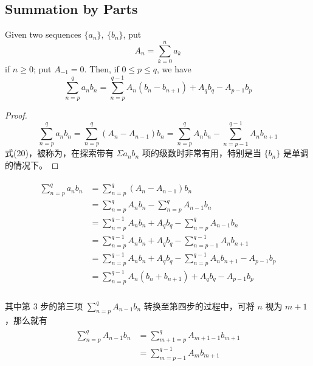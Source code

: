 \documentclass[../poma-notes.tex]{subfiles}
\begin{document}
\subsection*{Summation by Parts}

\begin{theorem}
  Given two sequences $\{a_n\},\ \{b_n\}$, put
  \[ A_n = \sum_{k=0}^{n} a_k \]
  if $n \ge 0$; put $A_{-1} = 0$. Then, if $0 \le p \le q$, we have
  \begin{equation}
    \sum_{n=p}^{q} a_n b_n = \sum_{n=p}^{q-1} A_n(b_n-b_{n+1}) + A_q b_q - A_{p-1}b_p
  \end{equation}
\end{theorem}

\begin{proof}
  \[
    \sum_{n=p}^{q} a_n b_n = \sum_{n=p}^{q}(A_n - A_{n-1})b_n = \sum_{n=p}^{q} A_n b_n - \sum_{n=p-1}^{q-1}A_n b_{n+1}
  \]
  式(20)，被称为，在探索带有 $\Sigma a_n b_n$ 项的级数时非常有用，特别是当 $\{b_n\}$
  是单调的情况下。
\end{proof}

\begin{anote}
  \begin{align*}
    \begin{split}
      \sum_{n=p}^{q} a_n b_n & = \sum_{n=p}^{q} (A_n - A_{n-1}) b_n \\
      & = \sum_{n=p}^{q} A_n b_n - \sum_{n=p}^{q} A_{n-1} b_n \\
      & = \sum_{n=p}^{q-1} A_n b_n + A_q b_q - \sum_{n=p}^{q} A_{n-1} b_n \\
      & = \sum_{n=p}^{q-1} A_n b_n + A_q b_q - \sum_{n=p-1}^{q-1} A_n b_{n+1} \\
      & = \sum_{n=p}^{q-1} A_n b_n + A_q b_q - \sum_{n=p}^{q-1} A_n b_{n+1} - A_{p-1} b_p \\
      & = \sum_{n=p}^{q-1} A_n (b_n + b_{n+1}) + A_q b_q - A_{p-1} b_p \\
    \end{split}
  \end{align*}

  其中第 3 步的第三项 $\sum_{n=p}^{q} A_{n-1} b_n$ 转换至第四步的过程中，可将 $n$ 视为 $m+1$，那么就有
  \begin{align*}
    \begin{split}
      \sum_{n=p}^{q} A_{n-1} b_n & = \sum_{m+1=p}^{q} A_{m+1-1} b_{m+1} \\
      & = \sum_{m=p-1}^{q-1} A_m b_{m+1}
    \end{split}
  \end{align*}
\end{anote}
\end{document}
